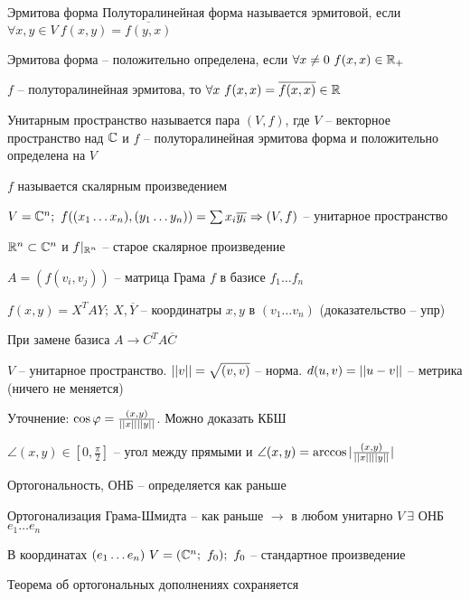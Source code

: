 \documentclass[12pt]{article}
\begin{document}
\begin{defin}{Эрмитова форма}
    Полуторалинейная форма называется эрмитовой, если $\forall x, y \in V\ f(x, y) = \overline{f(y, x)}$
\end{defin}

\begin{defin}{}
    Эрмитова форма -- положительно определена, если $\forall x \neq 0\ f(x, x) \in \mathbb R_+$
\end{defin}

\begin{Remark}{}
    $f$ -- полуторалинейная эрмитова, то $\forall x\ f(x, x) = \overline{f(x, x)} \in \R$
\end{Remark}

\begin{defin}{}
    Унитарным пространство называется пара $(V, f)$, где $V$ -- векторное пространство над $\mathbb C$ и $f$ -- полуторалинейная эрмитова форма и положительно определена на $V$

    $f$ называется скалярным произведением
\end{defin}

\begin{Example}{}
    $V = \mathbb C^n;\ f((x_1 \ldots x_n), (y_1 \ldots y_n)) = \sum x_i\overline{y_i} \Rightarrow (V, f)$ -- унитарное пространство

    $\mathbb R^n \subset \mathbb C^n$ и $f|_{\mathbb R^n}$ -- старое скалярное произведение
\end{Example}

\begin{nota}{}
    $A = (f(v_i, v_j))$ -- матрица Грама $f$ в базисе $f_1 \ldots f_n$

    $f(x, y) = X^TAY;\ X, \overline{Y}$ -- координатры $x, y$ в $(v_1 \ldots v_n)$ (доказательство -- упр)

    При замене базиса $A \to C^TA\overline{C}$

    $V$ -- унитарное пространство. $|| v || = \sqrt{(v, v)}$ -- норма. $d(u, v) = || u - v ||$ -- метрика (ничего не меняется)

    Уточнение: $\cos\varphi = \frac{(x, y)}{|| x |||| y ||}$. Можно доказать КБШ 

    $\angle(x, y) \in [0, \frac{\pi}{2}]$ -- угол между прямыми и $\angle(x, y) = \arccos|{\frac{(x, y)}{|| x |||| y ||}}|$

    Ортогональность, ОНБ -- определяется как раньше

    Ортогонализация Грама-Шмидта -- как раньше $\to$ в любом унитарно $V\ \exists$ ОНБ $e_1 \ldots e_n$ 

    В координатах $(e_1 \ldots e_n)\ V = (\mathbb C^n;\ f_0);\ f_0$ -- стандартное произведение 

    Теорема об ортогональных дополнениях сохраняется 
\end{nota}
\end{document}
